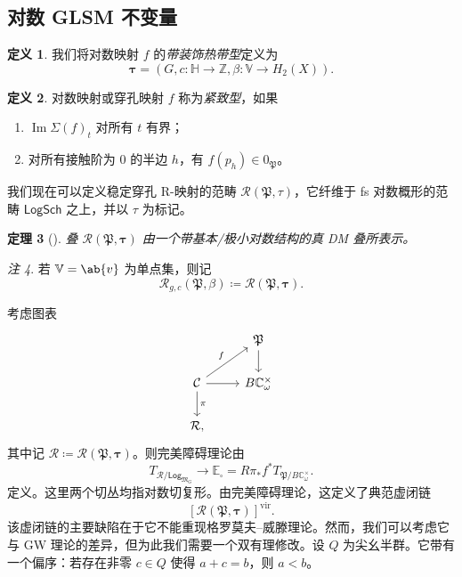 \documentclass{amsart}
\newtheorem{thm}{定理}[section]
\theoremstyle{definition}
\newtheorem{defn}[thm]{定义}
\theoremstyle{remark}
\newtheorem{rmk}[thm]{注}
\theoremstyle{plain}
\theoremstyle{definition}
\theoremstyle{remark}
\DeclareMathOperator{\Ima}{Im}
\newcommand{\C}{\mathbb{C}}
\newcommand{\Z}{\mathbb{Z}}
\newcommand{\E}{\mathbb{E}}
\newcommand{\V}{\mathbb{V}}
\renewcommand{\H}{\mathbb{H}}
\newcommand{\mc}[1]{\mathcal{#1}}
\newcommand{\mf}[1]{\mathfrak{#1}}
\newcommand{\mr}[1]{\mathrm{#1}}
\newcommand{\ms}[1]{\mathsf{#1}}
\newcommand{\1}{\mathbf{1}}
\newcommand{\2}{\mathbf{2}}
\newcommand{\3}{\mathbf{3}}
\newcommand{\vir}{\mr{vir}}
\begin{document}
\subsection{对数 GLSM 不变量}%
\label{sub:Log GLSM invariants}

\begin{defn}
    我们将对数映射 \(f\) 的\textit{带装饰热带型}定义为
    \[ \bm{\tau} = (G, c \colon \H \to \Z, \beta \colon \V \to H_2(X)). \]
\end{defn}

\begin{defn}
    对数映射或穿孔映射 \(f\) 称为\textit{紧致型}，如果
    \begin{enumerate}
        \item \(\Ima \Sigma(f)_t\) 对所有 \(t\) 有界；
        \item 对所有接触阶为 \(0\) 的半边 \(h\)，有 \(f(p_h) \in 0_{\mf{P}}\)。
    \end{enumerate}
\end{defn}

我们现在可以定义稳定穿孔 R-映射的范畴 \(\mc{R}(\mf{P}, \tau)\)，它纤维于 fs 对数概形的范畴 \(\ms{LogSch}\) 之上，并以 \(\tau\) 为标记。

\begin{thm}[{\cite{CJR2021,CJRpunctured}}]
    叠 \(\mc{R}(\mf{P},\bm{\tau})\) 由一个带基本/极小对数结构的真 DM 叠所表示。
\end{thm}

\begin{rmk}
    若 \(\V = \ab\{v\}\) 为单点集，则记
    \[ \mc{R}_{g, c}(\mf{P}, \beta) \coloneqq \mc{R}(\mf{P}, \bm{\tau}). \]
\end{rmk}

考虑图表
\begin{equation*}
\begin{tikzcd}
    & \mf{P} \ar{d} \\
    \mc{C} \ar{ur}{f} \ar{d}{\pi} \ar{r} & B \C_{\omega}^{\times} \\
    \mc{R},
\end{tikzcd}
\end{equation*}
其中记 \(\mc{R} \coloneqq \mc{R}(\mf{P}, \bm{\tau})\)。则完美障碍理论由
\[ T_{\mc{R}/\ms{Log}_{\mf{M}_G}} \to \E_{\square} = R \pi_* f^* T_{\mf{P}/B\C_{\omega}^{\times}}. \]
定义。这里两个切丛均指对数切复形。由完美障碍理论，这定义了典范虚闭链
\[ [\mc{R}(\mf{P}, \bm{\tau})]^{\vir}. \]
该虚闭链的主要缺陷在于它不能重现格罗莫夫--威滕理论。然而，我们可以考虑它与 GW 理论的差异，但为此我们需要一个双有理修改。设 \(Q\) 为尖幺半群。它带有一个偏序：若存在非零 \(c \in Q\) 使得 \(a+c = b\)，则 \(a < b\)。
\end{document}
